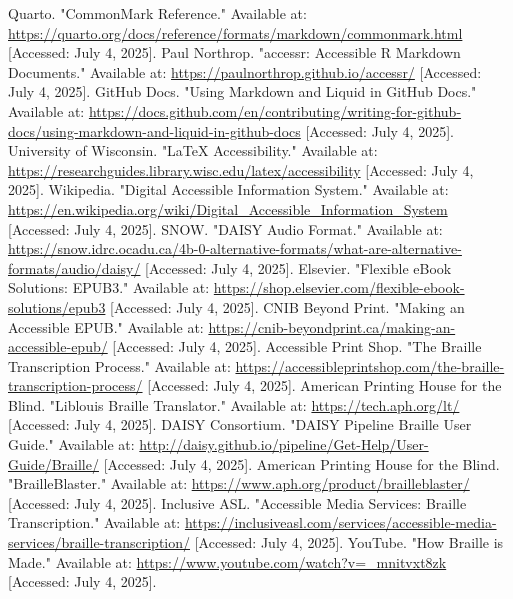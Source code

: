 \begin{thebibliography}{99}
 Quarto. "CommonMark Reference." Available at: \url{https://quarto.org/docs/reference/formats/markdown/commonmark.html} [Accessed: July 4, 2025].
 Paul Northrop. "accessr: Accessible R Markdown Documents." Available at: \url{https://paulnorthrop.github.io/accessr/} [Accessed: July 4, 2025].
 GitHub Docs. "Using Markdown and Liquid in GitHub Docs." Available at: \url{https://docs.github.com/en/contributing/writing-for-github-docs/using-markdown-and-liquid-in-github-docs} [Accessed: July 4, 2025].
 University of Wisconsin. "LaTeX Accessibility." Available at: \url{https://researchguides.library.wisc.edu/latex/accessibility} [Accessed: July 4, 2025].
 Wikipedia. "Digital Accessible Information System." Available at: \url{https://en.wikipedia.org/wiki/Digital_Accessible_Information_System} [Accessed: July 4, 2025].
 SNOW. "DAISY Audio Format." Available at: \url{https://snow.idrc.ocadu.ca/4b-0-alternative-formats/what-are-alternative-formats/audio/daisy/} [Accessed: July 4, 2025].
 Elsevier. "Flexible eBook Solutions: EPUB3." Available at: \url{https://shop.elsevier.com/flexible-ebook-solutions/epub3} [Accessed: July 4, 2025].
 CNIB Beyond Print. "Making an Accessible EPUB." Available at: \url{https://cnib-beyondprint.ca/making-an-accessible-epub/} [Accessed: July 4, 2025].
 Accessible Print Shop. "The Braille Transcription Process." Available at: \url{https://accessibleprintshop.com/the-braille-transcription-process/} [Accessed: July 4, 2025].
 American Printing House for the Blind. "Liblouis Braille Translator." Available at: \url{https://tech.aph.org/lt/} [Accessed: July 4, 2025].
 DAISY Consortium. "DAISY Pipeline Braille User Guide." Available at: \url{http://daisy.github.io/pipeline/Get-Help/User-Guide/Braille/} [Accessed: July 4, 2025].
 American Printing House for the Blind. "BrailleBlaster." Available at: \url{https://www.aph.org/product/brailleblaster/} [Accessed: July 4, 2025].
 Inclusive ASL. "Accessible Media Services: Braille Transcription." Available at: \url{https://inclusiveasl.com/services/accessible-media-services/braille-transcription/} [Accessed: July 4, 2025].
 YouTube. "How Braille is Made." Available at: \url{https://www.youtube.com/watch?v=_mnitvxt8zk} [Accessed: July 4, 2025].

\end{thebibliography}
